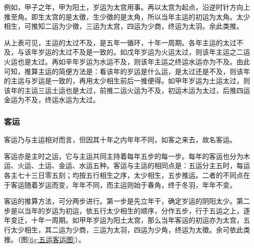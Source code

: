 \documentclass[12pt]{ctexbook}
\begin{document}
例如，甲子之年，甲为阳土，岁运为太宫用事。再以太宫为起点，沿逆时针方向上推至角。即生太宫的是太徵，生少徵的是太角，所以当年主运的初运为太角。太少相生，可推知二运为少徵，三运为太宫，四运为少商，终运为太羽。余此类推。

从上表可见，主运的太过不及，是五年一循环，十年一周期。各年主运的太过不及，与该年岁运的太过不及是一致的。如戊年岁运为火运太过，则该年主运之二运火运也是太过。再如辛年岁运为水运不及，则该年主运之终运水运亦为不及。由此可知，推算主运的简便方法是：看该年的岁运是什么运，是太过还是不及，则该年的主运与岁运是一致的，再用太少相生前后一推便得。如甲年岁运为土运太过，则该年的主运三运土运也是太过，前推二运火运为不及，初运木运为太过，后推四运金运为不及，终运水运为太过。

\subsubsection{客运}%

客运乃与主运相对而言，但因其十年之内年年不同，如客之来去，故名客运。

客运亦是主时之运，它与主运共同主持着每年五步的每一步。每年的客运也分为木运、火运、土运、金运、水运五种。客运与主运的相同点是：五运分主五时，每运各主七十三日零五刻；均按五行相生之序，太少相生，五步推运。二者的不同点在于客运随着岁运而变，年年不同，而主运则始于春角，终于冬羽，年年不变。

客运的推算方法，可分两步进行。第一步是先立年干，确定岁运的阴阳太少。第二步是以当年的岁运为初运，依五行太少相生的顺序，分作五步，行于五运之上，逐年变迁，十年一周期。如甲年岁运为阳土太宫，那么当年客运的初运亦为太宫，五行太少相生，其二运为少商，三运为太羽，四运为少角，终运为太徵。余可依此类推。（图\ref{fig:五运客运图}）。
\end{document}
